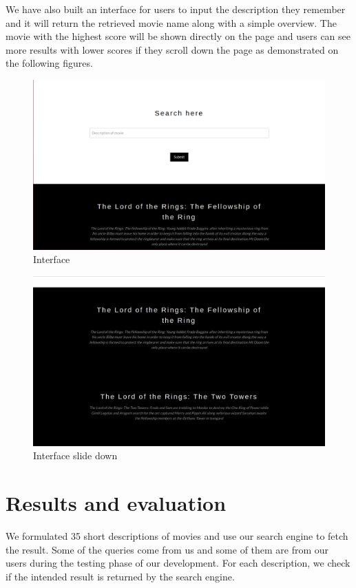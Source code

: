 \documentclass[sigconf,nonacm]{acmart}
\begin{document}
We have also built an interface for users to input the description they remember and it will return the retrieved movie name along with a simple overview. The movie with the highest score will be shown directly on the page and users can see more results with lower scores if they scroll down the page as demonstrated on the following figures.


\begin{figure}[H]
  \centering
  \includegraphics[width=0.8\linewidth]{interface.jpg}
  \caption{Interface}
\end{figure}

\begin{figure}[H]
  \centering
  \includegraphics[width=0.8\linewidth]{interface1.jpg}
  \caption{Interface slide down}
\end{figure}

\section{Results and evaluation}

We formulated 35 short descriptions of movies and use our search engine to
fetch the result.
Some of the queries come from us and some of them are from our users during
the testing phase of our development.
For each description, we check if the intended result is returned by the
search engine.
\end{document}
